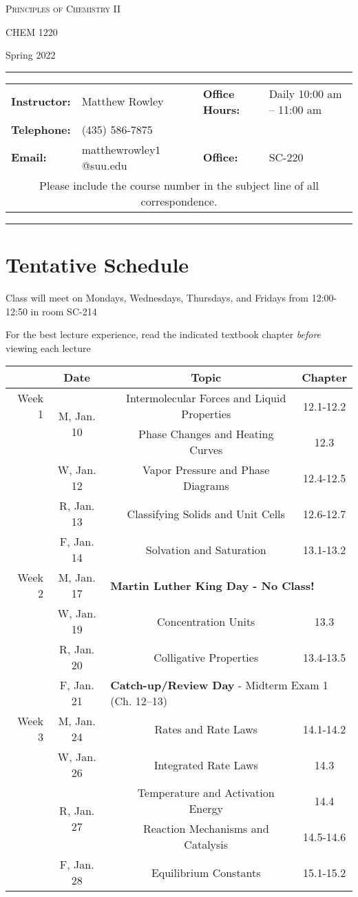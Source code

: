 \documentclass[12pt, letterpaper]{article}
\begin{document}
\begin{center}
	{\Large \textsc{Principles of Chemistry II}}
	
	CHEM 1220
\end{center}
\begin{center}
	{\large Spring 2022}
\end{center}
\begin{center}
	\rule{0.99\textwidth}{0.4pt}
	\begin{tabular}{llcll}
		\textbf{Instructor:} & Matthew Rowley & & \textbf{Office Hours:} & Daily 10:00 am -- 11:00 am \\
		\textbf{Telephone:} & (435) 586-7875 & & & \\
		\textbf{Email:} & matthewrowley$1$@suu.edu  & & \textbf{Office:} & SC-220\\
		\multicolumn{5}{c}{Please include the course number in the subject line of all correspondence.} 
	\end{tabular}
	\rule{0.99\textwidth}{0.4pt}
\end{center}


\section*{Tentative Schedule}
Class will meet on Mondays, Wednesdays, Thursdays, and Fridays from 12:00-12:50 in room SC-214

\noindent For the best lecture experience, read the indicated textbook chapter \emph{before} viewing each lecture

\begin{tabular}{rcccc}
	& Date && Topic & Chapter\\
	\midrule
	Week 1 & \multirow{2}{*}{M, Jan. 10}& & Intermolecular Forces and Liquid Properties & 12.1-12.2\\
	& & & Phase Changes and Heating Curves & 12.3\\
	& W, Jan. 12&& Vapor Pressure and Phase Diagrams & 12.4-12.5\\
	& R, Jan. 13&& Classifying Solids and Unit Cells & 12.6-12.7\\
	& F, Jan. 14&& Solvation and Saturation & 13.1-13.2\\
	\midrule
	Week 2 & M, Jan. 17& \multicolumn{3}{l}{\textbf{Martin Luther King Day - No Class!}}\\
	& W, Jan. 19&& Concentration Units & 13.3\\
	& R, Jan. 20&& Colligative Properties & 13.4-13.5\\
	& F, Jan. 21& \multicolumn{3}{l}{\textbf{Catch-up/Review Day} - Midterm Exam 1 (Ch. 12--13)}\\
	\midrule
	Week 3 & M, Jan. 24&& Rates and Rate Laws & 14.1-14.2\\
	& W, Jan. 26&& Integrated Rate Laws & 14.3\\
	& \multirow{2}{*}{R, Jan. 27}& & Temperature and Activation Energy & 14.4\\
	& & & Reaction Mechanisms and Catalysis & 14.5-14.6\\
	& F, Jan. 28&& Equilibrium Constants & 15.1-15.2\\
\end{tabular}
\end{document}
